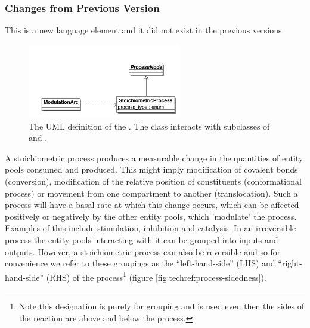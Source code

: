 \subsubsection{Changes from Previous Version}

This is a new language element and it did not exist in the previous versions.










\label{defn:StoichiometricProcess}\label{sec:techref:stoichiometricprocess}

\begin{figure}[htb]
  \centering
  \includegraphics[width = 0.6\textwidth]{images/stoichprocessuml}
  \caption{The UML definition of the
    . The class interacts with
    subclasses of  and .}
  \label{fig:techref:stoichprocessuml}
\end{figure}

A stoichiometric process produces a measurable change in the
quantities of entity pools consumed and produced. This might imply
modification of covalent bonds (conversion), modification of the
relative position of constituents (conformational process) or movement
from one compartment to another (translocation). Such a process will
have a basal rate at which this change occurs, which can be affected
positively or negatively by the other entity pools, which 'modulate'
the process. Examples of this include stimulation, inhibition and
catalysis. In an irreversible process the entity pools interacting
with it can be grouped into inputs and outputs. However, a
stoichiometric process can also be reversible and so for convenience
we refer to these groupings as the ``left-hand-side'' (LHS) and
``right-hand-side'' (RHS) of the process\footnote{Note this
  designation is purely for grouping and is used even then the sides
  of the reaction are above and below the process.}  (figure
\ref{fig:techref:process-sidedness}).

